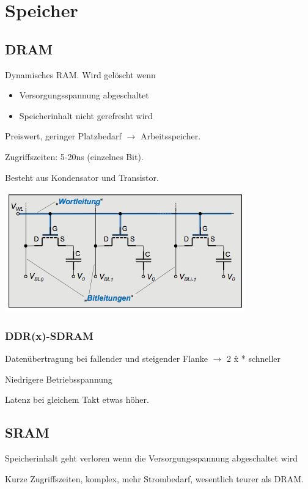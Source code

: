 \section{Speicher}


\subsection{DRAM}
Dynamisches RAM. 
Wird gelöscht wenn 
\begin{itemize}\itemsep0em
		\item Versorgungsspannung abgeschaltet
		\item Speicherinhalt nicht gerefresht wird
\end{itemize}	

Preiswert, geringer Platzbedarf $\rightarrow$ Arbeitsspeicher.

Zugriffszeiten: 5-20ns (einzelnes Bit).

Besteht aus Kondensator und Transistor.

\includegraphics[width=\linewidth]{dram.png}

\subsubsection{DDR(x)-SDRAM}
Datenübertragung bei fallender und steigender Flanke $\rightarrow$ 2 \^ x * schneller

Niedrigere Betriebsspannung

Latenz bei gleichem Takt etwas höher.

\subsection{SRAM}
Speicherinhalt geht verloren wenn die Versorgungsspannung abgeschaltet wird

Kurze Zugriffszeiten, komplex, mehr Strombedarf, wesentlich teurer als DRAM.

